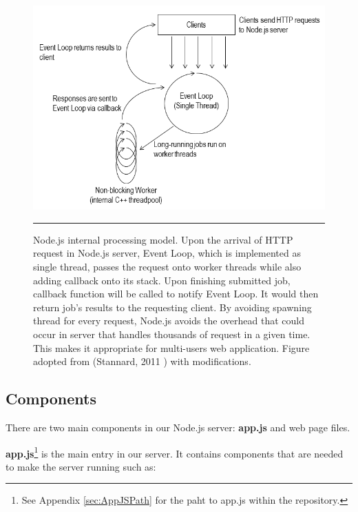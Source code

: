 \begin{figure}[htbp]
    \includegraphics[width=6in]{Figures/nodejs.png}
    \rule{35em}{0.5pt}
  \caption[Schema of Node.js's Processing Model.]{Node.js internal processing model. Upon the arrival of HTTP request in Node.js server, Event Loop, which is implemented as single thread, passes the request onto worker threads while also adding callback onto its stack. Upon finishing submitted job, callback function will be called to notify Event Loop. It would then return job's results to the requesting client. By avoiding spawning thread for every request, Node.js avoids the overhead that could occur in server that handles thousands of request in a given time. This makes it appropriate for multi-users web application. Figure adopted from (Stannard, 2011 \citep{stannard2011intro}) with modifications.}
  \label{fig:NodeJS}
\end{figure}

\subsection{Components}

There are two main components in our Node.js server: \textbf{app.js} and web page files.

\textbf{app.js}\footnote{See Appendix \ref{sec:AppJSPath} for the paht to app.js within the repository.} is the main entry in our server. It contains components that are needed to make the server running such as:

